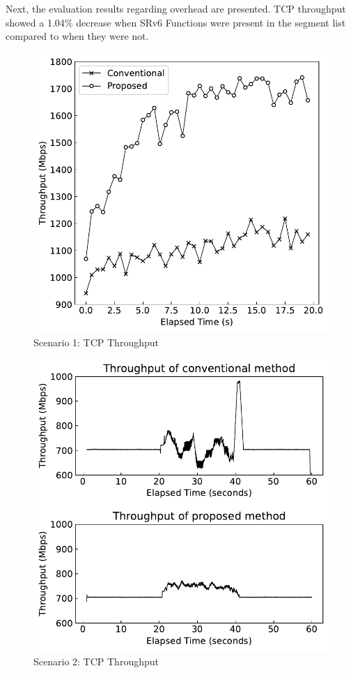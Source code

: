 \documentclass[conference]{IEEEtran}
\begin{document}
Next, the evaluation results regarding overhead are presented. TCP throughput showed a 1.04\% decrease when SRv6 Functions were present in the segment list compared to when they were not.

\begin{figure}[t]
  \centering
  \includegraphics[width=0.7\linewidth]{./figures/scenario-1.pdf}
  \caption{Scenario 1: TCP Throughput}
  \label{fig:scenario-1}
\end{figure}

\begin{figure}[t]
  \centering
  \includegraphics[width=0.7\linewidth]{./figures/scenario-2.pdf}
  \caption{Scenario 2: TCP Throughput}
  \label{fig:scenario-2}
\end{figure}

\end{document}
